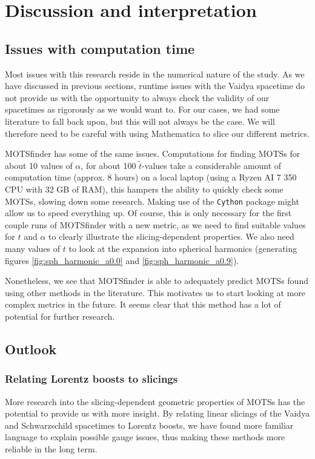 \documentclass[twoside, openright]{RadboudReport}
\begin{document}
\chapter{Discussion and interpretation}

\section{Issues with computation time}

Most issues with this research reside in the numerical nature of the study. As we have discussed in previous sections, runtime issues with the Vaidya spacetime do not provide us with the opportunity to always check the validity of our spacetimes as rigorously as we would want to. For our cases, we had some literature to fall back upon, but this will not always be the case. We will therefore need to be careful with using Mathematica to slice our different metrics. \newline

MOTSfinder has some of the same issues. Computations for finding MOTSs for about 10 values of $\alpha$, for about 100 $\tilde{t}$-values take a considerable amount of computation time (approx. 8 hours) on a local laptop (using a Ryzen AI 7 350 CPU with 32 GB of RAM), this hampers the ability to quickly check some MOTSs, slowing down some research. Making use of the \verb*|Cython| package might allow us to speed everything up. Of course, this is only necessary for the first couple runs of MOTSfinder with a new metric, as we need to find suitable values for $t$ and $\alpha$ to clearly illustrate the slicing-dependent properties. We also need many values of $t$ to look at the expansion into spherical harmonics (generating figures \ref{fig:sph_harmonic_a0.0} and \ref{fig:sph_harmonic_a0.9}). \newline

Nonetheless, we see that MOTSfinder is able to adequately predict MOTSs found using other methods in the literature. This motivates us to start looking at more complex metrics in the future. It seems clear that this method has a lot of potential for further research.

\section{Outlook}


\subsection{Relating Lorentz boosts to slicings}
More research into the slicing-dependent geometric properties of MOTSs has the potential to provide us with more insight. By relating linear slicings of the Vaidya and Schwarzschild spacetimes to Lorentz boosts, we have found more familiar language to explain possible gauge issues, thus making these methods more reliable in the long term. \newline
\end{document}
